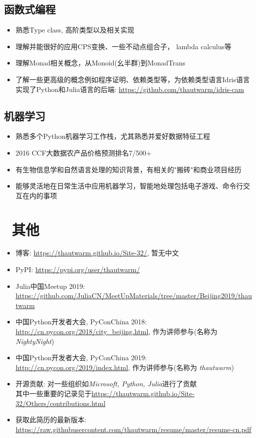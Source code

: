 \documentclass{resume}
\begin{document}
\subsection{\textbf{函数式编程}}
\begin{itemize}
  \item 熟悉Type class, 高阶类型以及相关实现
  \item 理解并能很好的应用CPS变换、一些不动点组合子， lambda calculus等
  \item 理解Monad相关概念，从Monoid(幺半群)到MonadTrans
  \item 了解一些更高级的概念例如程序证明、依赖类型等，为依赖类型语言Idris语言实现了Python和Julia语言的后端: \url{https://github.com/thautwarm/idris-cam}
\end{itemize}


\subsection{\textbf{机器学习}}
\begin{itemize}
  \item 熟悉多个Python机器学习工作栈，尤其熟悉并爱好数据特征工程
  \item 2016 CCF大数据农产品价格预测排名7/500+
  \item 有生物信息学和自然语言处理的知识背景，有相关的"搬砖"和商业项目经历
  \item 能够灵活地在日常生活中应用机器学习，智能地处理包括电子游戏、命令行交互在内的事项
\end{itemize}

\section{\faInfo\ 其他}
\begin{itemize}[parsep=0.25ex]
  \item 博客: \url{https://thautwarm.github.io/Site-32/}, 暂无中文
  \item PyPI: \url{https://pypi.org/user/thautwarm/}
  \item Julia中国Meetup 2019: \url{https://github.com/JuliaCN/MeetUpMaterials/tree/master/Beijing2019/thautwarm}
  \item 中国Python开发者大会, PyConChina 2018: \url{http://cn.pycon.org/2018/city_beijing.html}, 作为讲师参与(名称为 \textit{NightyNight})
  \item 中国Python开发者大会, PyConChina 2019: \url{http://cn.pycon.org/2019/index.html}, 作为讲师参与(名称为 \textit{thautwarm})
  \item 开源贡献: 对一些组织如\textit{Microsoft, Python, Julia}进行了贡献 \\
        其中一些重要的记录见于\url{https://thautwarm.github.io/Site-32/Others/contributions.html}
  \item 获取此简历的最新版本: \url{https://raw.githubusercontent.com/thautwarm/resume/master/resume-cn.pdf}
\end{itemize}


%
%
\end{document}
